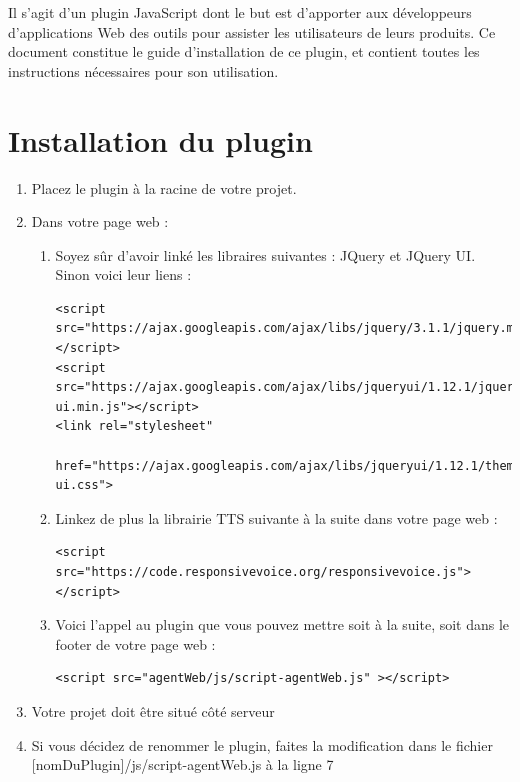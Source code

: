 \documentclass[11pt,dvipsnames,svgnames]{report}
\begin{document}
	Il s'agit d'un plugin JavaScript dont le but est d'apporter aux développeurs d'applications Web des outils pour assister les utilisateurs de leurs produits. Ce document constitue le guide d'installation de ce plugin, et contient toutes les instructions nécessaires pour son utilisation.
	
\chapter{Installation du plugin}

\begin{enumerate}  
\item Placez le plugin à la racine de votre projet.
\item Dans votre page web :
	\begin{enumerate}
	\item Soyez sûr d'avoir linké les libraires suivantes : JQuery et JQuery UI. Sinon voici leur liens :\\
\begin{lstlisting}
<script src="https://ajax.googleapis.com/ajax/libs/jquery/3.1.1/jquery.min.js"></script>
<script src="https://ajax.googleapis.com/ajax/libs/jqueryui/1.12.1/jquery-ui.min.js"></script>
<link rel="stylesheet"
 		href="https://ajax.googleapis.com/ajax/libs/jqueryui/1.12.1/themes/smoothness/jquery-ui.css">
\end{lstlisting} 
\item  Linkez de plus la librairie TTS suivante à la suite dans votre page web :\\
\begin{lstlisting}
<script src="https://code.responsivevoice.org/responsivevoice.js"></script>
\end{lstlisting}
\item Voici l'appel au plugin que vous pouvez mettre soit à la suite, soit dans le footer de votre page web :\\
\begin{lstlisting}
<script src="agentWeb/js/script-agentWeb.js" ></script>
\end{lstlisting}
\end{enumerate}
\item Votre projet doit être situé côté serveur\\
\item Si vous décidez de renommer le plugin, faites la modification dans le fichier [nomDuPlugin]/js/script-agentWeb.js à la ligne 7\\
\end{enumerate}
\end{document}
